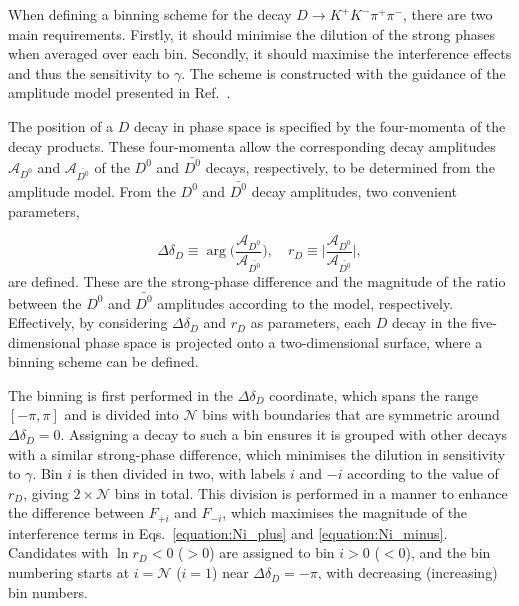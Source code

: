 \documentclass[12pt, a4paper, notitlepage, onecolumn]{article}
\begin{document}
When defining a binning scheme for the decay $D\to K^+K^-\pi^+\pi^-$, there are two main requirements. Firstly, it should minimise the dilution of the strong phases when averaged over each bin. Secondly, it should maximise the interference effects and thus the sensitivity to $\gamma$. The scheme is constructed with the guidance   of the amplitude model presented in Ref.~\cite{LHCb-PAPER-2018-041}.
 
The position of a $D$ decay in phase space is specified by the four-momenta of the decay products.  These four-momenta allow the corresponding decay amplitudes $\mathcal{A}_{D^0}$ and $\mathcal{A}_{\bar{D^0}}$ of the $D^0$ and $\bar{D^0}$ decays, respectively, to be determined from the amplitude model.  From the $D^0$ and $\bar{D^0}$ decay amplitudes, two convenient parameters,

\begin{equation}
    \Delta\delta_D\equiv\arg\Big(\frac{\mathcal{A}_{D^0}}{\mathcal{A}_{\bar{D^0}}}\Big), \quad r_D\equiv\Big\lvert\frac{\mathcal{A}_{D^0}}{\mathcal{A}_{\bar{D^0}}}\Big\rvert,
\end{equation}
are defined. These are the strong-phase difference and the magnitude of the ratio between the $D^0$ and $\bar{D^0}$ amplitudes according to the model, respectively. Effectively, by considering $\Delta\delta_D$ and $r_D$ as parameters, each $D$ decay in the five-dimensional phase space is projected onto a two-dimensional surface, where a binning scheme can be defined.

The binning is first performed in the $\Delta\delta_D$ coordinate, which spans the range $[-\pi, \pi]$ and is divided into $\mathcal{N}$ bins with boundaries that are symmetric around $\Delta\delta_D=0$. Assigning a decay to such a bin ensures it is grouped with other decays with a similar strong-phase difference, which minimises the dilution in sensitivity to $\gamma$. Bin $i$ is then divided in two, with labels $i$ and $-i$ according to the value of $r_{D}$, giving $2 \times {\mathcal N}$ bins in total. This division is performed in a manner to enhance the difference between $F_{+i}$ and $F_{-i}$, which maximises the magnitude of the interference terms in Eqs.~\eqref{equation:Ni_plus} and \eqref{equation:Ni_minus}. Candidates with $\ln r_D < 0$ ($> 0$) are assigned to bin $i > 0$ ($< 0$), and the bin numbering starts at $i = \mathcal{N}$ ($i = 1$) near $\Delta\delta_D = -\pi$, with decreasing (increasing) bin numbers.
\end{document}
